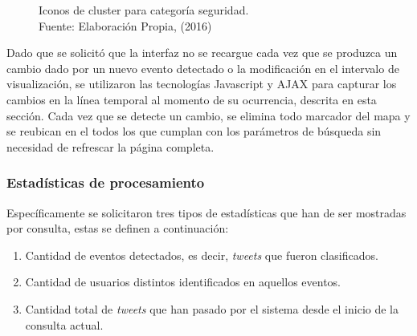 \begin{figure}[H]
\centering
{}\hfill
{}\hfill
{}
\caption[Iconos de cluster para categoría seguridad.]{Iconos de cluster para categoría seguridad.\\Fuente: Elaboración Propia, (2016)}
\label{fig:clusterseguridad}
\end{figure}

Dado que se solicitó que la interfaz no se recargue cada vez que se produzca un cambio dado por un nuevo evento detectado o la modificación en el intervalo de visualización, se utilizaron las tecnologías Javascript y AJAX para capturar los cambios en la línea temporal al momento de su ocurrencia, descrita en esta sección. Cada vez que se detecte un cambio, se elimina todo marcador del mapa y se reubican en el todos los que cumplan con los parámetros de búsqueda sin necesidad de refrescar la página completa.

\subsubsection*{Estadísticas de procesamiento}
\label{subsubsec:estadisticasdeproc}

Específicamente se solicitaron tres tipos de estadísticas que han de ser mostradas por consulta, estas se definen a continuación:

\begin{enumerate}
\item Cantidad de eventos detectados, es decir, \textit{tweets} que fueron clasificados.
\item Cantidad de usuarios distintos identificados en aquellos eventos.
\item Cantidad total de \textit{tweets} que han pasado por el sistema desde el inicio de la consulta actual.
\end{enumerate}

